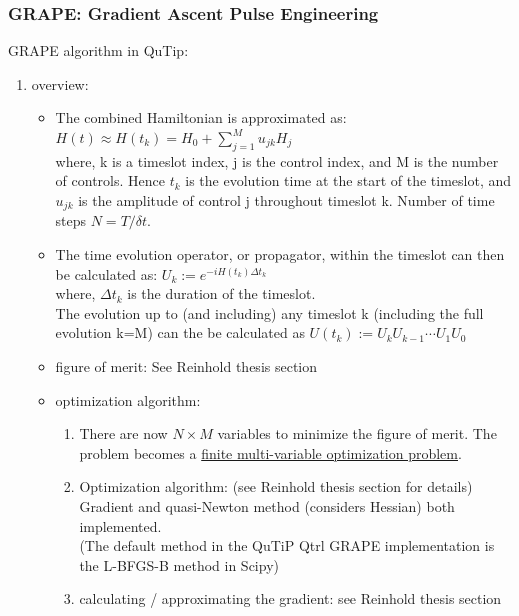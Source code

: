 \documentclass{article}
\begin{document}
\subsubsection{GRAPE: Gradient Ascent Pulse Engineering}
GRAPE algorithm in QuTip: 
\begin{enumerate}
    \item overview: \\
    \begin{itemize}
        \item The combined Hamiltonian is approximated as: $H(t) \approx H\left(t_k\right)=H_0+\sum_{j=1}^M u_{j k} H_j$ \\
        where,  k is a timeslot index, 
                j is the control index, 
                and M is the number of controls. 
                Hence $t_k$ is the evolution time at the start of the timeslot, 
                and $u_{jk}$ is the amplitude of control j throughout timeslot k.
                Number of time steps $N=T/\delta t$.\\
        \item The time evolution operator, or propagator, within the timeslot can then be calculated as:  
                $U_k:=e^{-i H\left(t_k\right) \Delta t_k}$ \\
                where, $\Delta t_k$ is the duration of the timeslot.\\
                The evolution up to (and including) any timeslot k (including the full evolution k=M) can the be calculated as 
                $U\left(t_k\right):=U_k U_{k-1} \cdots U_1 U_0$
        \item figure of merit: See Reinhold thesis section
        \item optimization algorithm: 
            \begin{enumerate}
                \item There are now $N\times M$ variables to minimize the figure of merit. 
                    The problem becomes a \underline{finite multi-variable optimization problem}.
                \item Optimization algorithm: (see Reinhold thesis section for details)\\
                    Gradient and quasi-Newton method (considers Hessian) both implemented.\\
                    (The default method in the QuTiP Qtrl GRAPE implementation is the L-BFGS-B method in Scipy)
                \item calculating / approximating the gradient: see Reinhold thesis section

            \end{enumerate}
    \end{itemize}
\end{enumerate}
\end{document}
